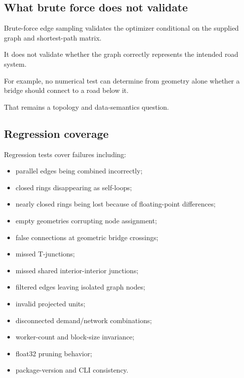 \documentclass[11pt]{article}
\begin{document}
\subsection{What brute force does not validate}

Brute-force edge sampling validates the optimizer conditional on the supplied
graph and shortest-path matrix.

It does not validate whether the graph correctly represents the intended road
system.

For example, no numerical test can determine from geometry alone whether a
bridge should connect to a road below it.

That remains a topology and data-semantics question.

\subsection{Regression coverage}

Regression tests cover failures including:

\begin{itemize}[leftmargin=1.5em]

\item parallel edges being combined incorrectly;

\item closed rings disappearing as self-loops;

\item nearly closed rings being lost because of floating-point differences;

\item empty geometries corrupting node assignment;

\item false connections at geometric bridge crossings;

\item missed T-junctions;

\item missed shared interior-interior junctions;

\item filtered edges leaving isolated graph nodes;

\item invalid projected units;

\item disconnected demand/network combinations;

\item worker-count and block-size invariance;

\item float32 pruning behavior;

\item package-version and CLI consistency.

\end{itemize}
\end{document}
